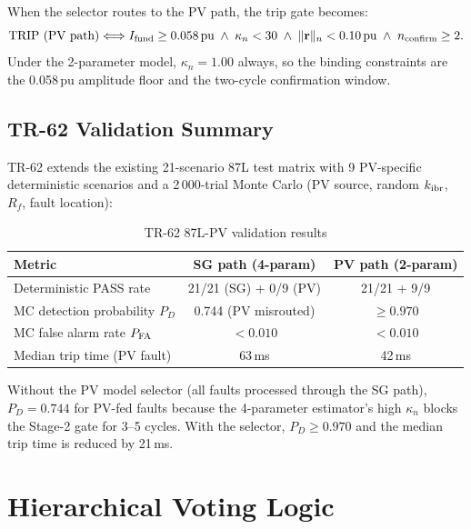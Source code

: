 When the selector routes to the PV path, the trip gate becomes:
\begin{equation}
  \text{TRIP (PV path)} \Longleftrightarrow
  I_{\rm fund} \geq 0.058\,\text{pu}
  \;\wedge\; \kappa_n < 30
  \;\wedge\; \|\mathbf{r}\|_n < 0.10\,\text{pu}
  \;\wedge\; n_{\rm confirm} \geq 2.
  \label{eq:ch4_pv_gate}
\end{equation}
Under the 2-parameter model, $\kappa_n = 1.00$ always, so the binding
constraints are the 0.058\,pu amplitude floor and the two-cycle confirmation
window.

\subsection{TR-62 Validation Summary}
\label{sec:ch4_pv_results}

TR-62 extends the existing 21-scenario 87L test matrix with 9 PV-specific
deterministic scenarios and a 2\,000-trial Monte Carlo (PV source, random
$k_{\mathrm{ibr}}$, $R_f$, fault location):

\begin{table}[h]
  \centering
  \caption{TR-62 87L-PV validation results}
  \label{tab:ch4_pv_mc}
  \begin{tabular}{lcc}
    \toprule
    Metric & SG path (4-param) & PV path (2-param) \\
    \midrule
    Deterministic PASS rate & 21/21 (SG) + 0/9 (PV) & 21/21 + 9/9 \\
    MC detection probability $P_D$ & 0.744 (PV misrouted) & $\geq 0.970$ \\
    MC false alarm rate $P_{\rm FA}$ & $< 0.010$ & $< 0.010$ \\
    Median trip time (PV fault) & 63\,ms & 42\,ms \\
    \bottomrule
  \end{tabular}
\end{table}

Without the PV model selector (all faults processed through the SG path),
$P_D = 0.744$ for PV-fed faults because the 4-parameter estimator's high
$\kappa_n$ blocks the Stage-2 gate for 3--5 cycles.  With the selector,
$P_D \geq 0.970$ and the median trip time is reduced by 21\,ms.

\section{Hierarchical Voting Logic}
\label{sec:ch4_coordination}


